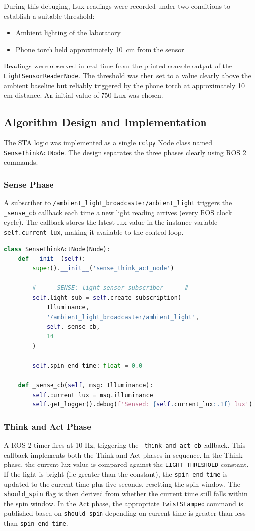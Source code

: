 \documentclass[11 pt , a 4 paper ]{article}
\theoremstyle{definition}
\begin{document}
\noindent During this debuging, Lux readings were recorded under two conditions to establish a suitable threshold:

\begin{itemize}
	\item Ambient lighting of the laboratory
	\item Phone torch held approximately 10~cm from the sensor
\end{itemize}

\noindent Readings were observed in real time from the printed console output of the \texttt{LightSensorReaderNode}. The threshold was then set to a value clearly above the ambient baseline but reliably triggered by the phone torch at approximately 10 cm distance. An initial value of 750 Lux was chosen.
\subsection{Algorithm Design and Implementation}
The STA logic was implemented as a single \texttt{rclpy} Node class named \texttt{SenseThinkActNode}. The design separates the three phases clearly using ROS 2 commands.
\subsubsection{Sense Phase}
A subscriber to \texttt{/ambient\_light\_broadcaster/ambient\_light} triggers the \texttt{\_sense\_cb} callback each time a new light reading arrives (every ROS clock cycle). The callback stores the latest lux value in the instance variable \texttt{self.current\_lux}, making it available to the control loop.
\begin{lstlisting}[language=python]
class SenseThinkActNode(Node):
	def __init__(self):
		super().__init__('sense_think_act_node')
		
		# ---- SENSE: light sensor subscriber ---- #
		self.light_sub = self.create_subscription(
			Illuminance,
			'/ambient_light_broadcaster/ambient_light',
			self._sense_cb,
			10
		)
		
		self.spin_end_time: float = 0.0
		
	def _sense_cb(self, msg: Illuminance):
		self.current_lux = msg.illuminance
		self.get_logger().debug(f'Sensed: {self.current_lux:.1f} lux')
\end{lstlisting}
\subsubsection{Think and Act Phase}
A ROS 2 timer fires at 10 Hz, triggering the \texttt{\_think\_and\_act\_cb} callback. This callback implements both the Think and Act phases in sequence. In the Think phase, the current lux value is compared against the \texttt{LIGHT\_THRESHOLD} constant. If the light is bright (i.e greater than the constant), the \texttt{spin\_end\_time} is updated to the current time plus five seconds, resetting the spin window. The \texttt{should\_spin} flag is then derived from whether the current time still falls within the spin window. In the Act phase, the appropriate \texttt{TwistStamped} command is published based on \texttt{should\_spin} depending on current time is greater than less than \texttt{spin\_end\_time}.\\
\end{document}
